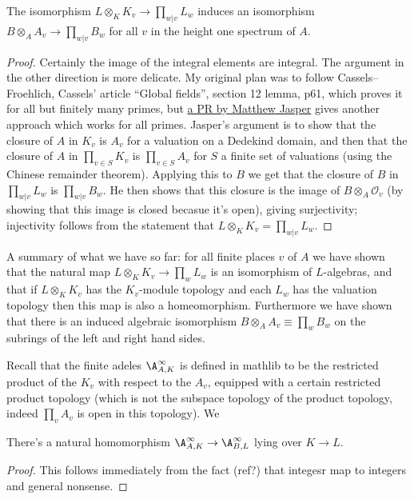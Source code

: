 \begin{theorem}
  \label{IsDedekindDomain.HeightOneSpectrum.adicCompletionComapAlgEquiv_integral}
  The isomorphism $L\otimes_KK_v\to\prod_{w|v}L_w$ induces an isomorphism
  $B\otimes_AA_v\to \prod_{w|v}B_w$
  for all $v$ in the height one spectrum of $A$.
\end{theorem}
\begin{proof}
  Certainly the image of the integral elements are integral. The argument in the other
  direction is more delicate. My original plan was to follow Cassels--Froehlich,
  Cassels' article ``Global fields'', section 12 lemma, p61, which proves it for
  all but finitely many primes, but \href{https://github.com/ImperialCollegeLondon/FLT/pull/400}
  {a PR by Matthew Jasper} gives another approach which works for all primes.
  Jasper's argument is to show that the closure of $A$ in $K_v$ is $A_v$
  for a valuation on a Dedekind domain, and then that the closure of $A$ in $\prod_{v\in S}K_v$
  is $\prod_{v\in S}A_v$ for $S$ a finite set of valuations (using the Chinese
  remainder theorem). Applying this to $B$ we get that the closure of $B$ in $\prod_{w|v}L_w$
  is $\prod_{w|v}B_w$. He then shows that this closure is the image of
  $B\otimes_A\mathcal{O}_v$ (by showing that this image is closed becasue it's open),
  giving surjectivity; injectivity follows from the statement
  that $L\otimes_KK_v=\prod_{w|v}L_w$.
\end{proof}

A summary of what we have so far: for all finite places $v$ of $A$
we have shown that the natural map $L\otimes_KK_v\to\prod_wL_w$
is an isomorphism of $L$-algebras, and that if $L\otimes_KK_v$ has
the $K_v$-module topology and each $L_w$ has the valuation topology
then this map is also a homeomorphism. Furthermore we have shown
that there is an induced algebraic isomorphism $B\otimes_AA_v\equiv\prod_w B_w$
on the subrings of the left and right hand sides.

Recall that the finite adeles $\A_{A,K}^\infty$ is defined in mathlib to be
the restricted product of the $K_v$ with respect to the $A_v$, equipped with a certain
restricted product topology (which is not the subspace topology of the product
topology, indeed $\prod_v A_v$ is open in this topology). We

\begin{theorem} There's a natural homomorphism
  $\A_{A,K}^\infty\to\A_{B,L}^\infty$ lying over $K\to L$.
  \label{IsDedekindDomain.FiniteAdeleRing.mapSemialgHom}
  \leanok
\end{theorem}
\begin{proof}
  This follows immediately from the fact (ref?) that integesr map to integers
  and general nonsense.
\end{proof}

